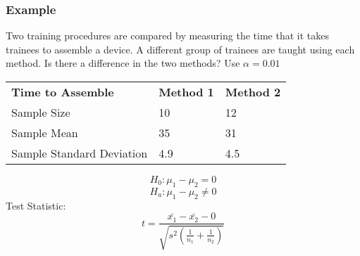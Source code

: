 \documentclass[12pt, letterpaper]{article}
\begin{document}
            \subsubsection*{Example}
                Two training procedures are compared by measuring the time that it takes trainees to assemble a device. A different group of trainees are taught using each method. Is there a difference in the two methods? Use $\alpha = 0.01$
                \begin{center}
                    \begin{tabular}{|l|l|l|}
                        \cline{1-3}
                        \textbf{Time to Assemble} & \textbf{Method 1} & \textbf{Method 2} \\ \cline{1-3}
                        Sample Size & 10 & 12 \\ \cline{1-3}
                        Sample Mean & 35 & 31 \\ \cline{1-3}
                        Sample Standard Deviation & 4.9 & 4.5 \\ \cline{1-3}
                    \end{tabular}
                    \begin{mdframed}[leftmargin=0.5cm, rightmargin=0.5cm]
                        \begin{equation*}
                            H_0 : \mu_1 - \mu_2 = 0
                        \end{equation*}
                        \begin{equation*}
                            H_a : \mu_1 - \mu_2 \neq 0
                        \end{equation*}
                        Test Statistic:
                        \begin{equation*}
                            t = \frac{\bar{x_1} - \bar{x_2} - 0}{\sqrt{s^2\left(\frac{1}{n_1} + \frac{1}{n_2}\right)}}
                        \end{equation*}
                    \end{mdframed}
                \end{center}
\end{document}
